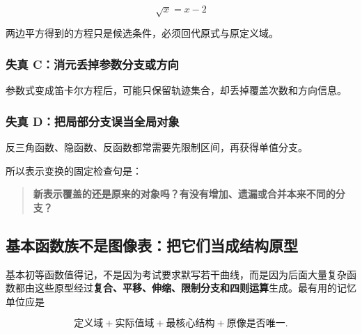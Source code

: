 \documentclass[11pt,a4paper]{ctexart}
\begin{document}
\[
\sqrt{x}=x-2
\]

两边平方得到的方程只是候选条件，必须回代原式与原定义域。

\subsubsection{失真
C：消元丢掉参数分支或方向}\label{ux5931ux771f-cux6d88ux5143ux4e22ux6389ux53c2ux6570ux5206ux652fux6216ux65b9ux5411}

参数式变成笛卡尔方程后，可能只保留轨迹集合，却丢掉覆盖次数和方向信息。

\subsubsection{失真
D：把局部分支误当全局对象}\label{ux5931ux771f-dux628aux5c40ux90e8ux5206ux652fux8befux5f53ux5168ux5c40ux5bf9ux8c61}

反三角函数、隐函数、反函数都常需要先限制区间，再获得单值分支。

所以表示变换的固定检查句是：

\begin{quote}
\textbf{新表示覆盖的还是原来的对象吗？有没有增加、遗漏或合并本来不同的分支？}
\end{quote}

\subsection{基本函数族不是图像表：把它们当成结构原型}

基本初等函数值得记，不是因为考试要求默写若干曲线，而是因为后面大量复杂函数都由这些原型经过\textbf{复合、平移、伸缩、限制分支和四则运算}生成。最有用的记忆单位应是

\[
\boxed{
\text{定义域}
+\text{实际值域}
+\text{最核心结构}
+\text{原像是否唯一}
}.
\]
\end{document}
